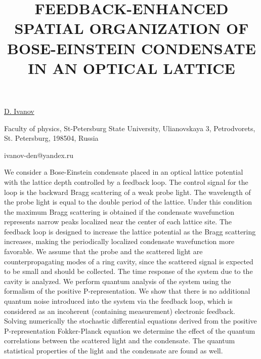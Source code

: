 \title{FEEDBACK-ENHANCED SPATIAL ORGANIZATION OF BOSE-EINSTEIN CONDENSATE IN AN OPTICAL LATTICE}

\underline{D. Ivanov}

{\normalsize{
\vspace{-4mm} Faculty of physics, St-Petersburg State University, Ulianovskaya 3,
Petrodvorets, St. Petersburg, 198504, Russia


\email ivanov-den@yandex.ru}}

We consider a Bose-Einstein condensate placed in an optical lattice potential with the lattice depth
controlled by a feedback loop. The control signal for the loop is the backward Bragg scattering of a
weak probe light. The wavelength of the probe light is equal to the double period of the lattice.
Under this condition the maximum Bragg scattering is obtained if the condensate wavefunction
represents narrow peaks localized near the center of each lattice site. The feedback loop is
designed to increase the lattice potential as the Bragg scattering increases, making the
periodically localized condensate wavefunction more favorable. We assume that the probe and the
scattered light are counterpropagating modes of a ring cavity, since the scattered signal is
expected to be small and should be collected. The time response of the system due to the cavity is
analyzed.
We perform quantum analysis of the system using the formalism of the positive P-representation. We show that there is no additional quantum noise introduced into the system via the
feedback loop, which is considered as an incoherent (containing measurement) electronic feedback.
Solving numerically the stochastic differential equations derived from the positive P-representation
Fokker-Planck equation we determine the effect of the quantum correlations between the scattered
light and the condensate.  The quantum statistical properties of the light and the condensate are
found as well. 

\vspace{\baselineskip}
